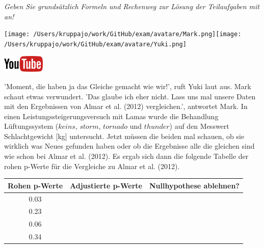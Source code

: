 \documentclass[a4paper, 9pt]{scrartcl}\usepackage[]{graphicx}\usepackage[]{xcolor}
\newenvironment{knitrout}{}{} %
\begin{document}
\textit{Geben Sie grundsätzlich Formeln und Rechenweg zur Lösung der Teilaufgaben mit an!} \\[1Ex]
 

 
\begin{minipage}[t]{0.5\textwidth}
\texttt{[image: /Users/kruppajo/work/GitHub/exam/avatare/Mark.png]}\hspace{-4mm}\texttt{[image: /Users/kruppajo/work/GitHub/exam/avatare/Yuki.png]}
\end{minipage}
\begin{minipage}[t]{0.5\textwidth}
\hfill
\href{https://youtu.be/kHmfEmU6lrk}{\includegraphics[width = 2cm]{img/youtube}}
\end{minipage}
\vspace{1ex}



'Moment, die haben ja das Gleiche gemacht wie wir!', ruft Yuki laut aus. Mark schaut etwas verwundert. 'Das glaube ich eher nicht. Lass uns mal unsere Daten mit den Ergebnissen von Almar et al. (2012) vergleichen.', antwortet Mark. In einen Leistungssteigerungsversuch mit Lamas wurde die Behandlung Lüftungssystem ($keins$, $storm$, $tornado$ und $thunder$) auf den Messwert Schlachtgewicht [kg] untersucht. Jetzt müssen die beiden mal schauen, ob sie wirklich was Neues gefunden haben oder ob die Ergebnisse alle die gleichen sind wie schon bei Almar et al. (2012). Es ergab sich dann die folgende Tabelle der rohen p-Werte für die Vergleiche zu Almar et al. (2012).

\begin{knitrout}
\color{fgcolor}\begin{table}[!h]
\centering\begingroup\fontsize{10}{12}\selectfont

\begin{tabular}{ccc}
\toprule
\textbf{Rohen p-Werte} & \textbf{Adjustierte p-Werte} & \textbf{Nullhypothese ablehnen?}\\
\midrule
0.03 &  & \\
0.23 &  & \\
0.06 &  & \\
0.34 &  & \\
\bottomrule
\end{tabular}
\endgroup{}
\end{table}

\end{knitrout}
\end{document}
